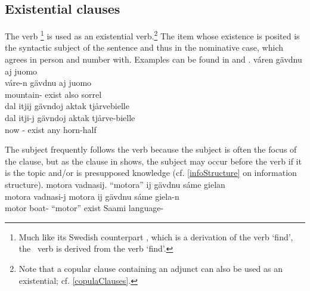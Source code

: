 \subsection{Existential clauses}\label{existentialClauses}
The verb \footnote{Much like its Swedish counterpart %
, which is a derivation of the verb  ‘find’, the \PS\ verb  is derived from the verb  ‘find’.} 
is used as an existential verb.\footnote{Note that a copular clause containing an adjunct can also be used as an existential; cf. \SEC\ref{copulaClauses}.} 
The item whose existence is posited is the syntactic subject of the sentence and thus in the nominative case, which  agrees in person and number with. 
Examples can be found in  and .%
\ea\label{existential1}
\glll	váren gävdnu aj juomo\\
	váre-n gävdnu aj juomo\\
	mountain- exist\BS{} also sorrel\BS{}\\\nopagebreak
{} 
\z
\ea\label{existential2}
\glll	dal itjij gävndoj aktak tjårvebielle\\
	dal itji-j gävndoj aktak tjårve-bielle\\
	now - exist\BS{} any horn-half\BS{}\\\nopagebreak
{} 
\z
{} 

The subject frequently follows the verb because the subject is often the focus of the clause, but as the clause in  shows, the subject may occur before the verb if it is the topic and/or is presupposed knowledge (cf. \SEC\ref{infoStructure} on information structure).
\ea\label{existential3}
\glll	motora vadnasij. “motora” ij gävdnu sáme gielan\\
	motora vadnasi-j motora ij gävdnu sáme giela-n\\
	motor\BS{} boat- “motor” \BS{} exist\BS{} Saami\BS{} language-\\\nopagebreak
{} 
\z
{}


